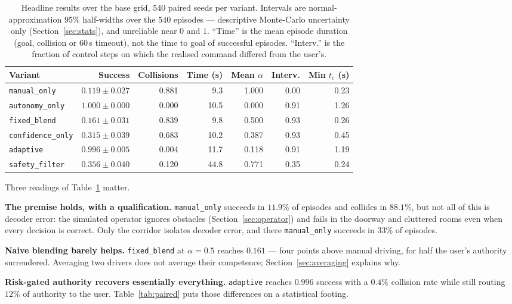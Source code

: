 \documentclass[11pt,a4paper]{article}
\newcommand{\vmanual}{\texttt{manual\_only}}
\newcommand{\vauto}{\texttt{autonomy\_only}}
\newcommand{\vfixed}{\texttt{fixed\_blend}}
\newcommand{\vconf}{\texttt{confidence\_only}}
\newcommand{\vadapt}{\texttt{adaptive}}
\newcommand{\vsafety}{\texttt{safety\_filter}}
\newcommand{\ttc}{t_{\mathrm{c}}}
\theoremstyle{plain}
\theoremstyle{definition}
\begin{document}
\begin{table}[htbp]
\centering
\small
\begin{tabular}{@{}lrrrrrr@{}}
\toprule
Variant & Success & Collisions & Time (s) & Mean $\alpha$ & Interv. & Min $\ttc$ (s)\\
\midrule
\vmanual  & $0.119 \pm 0.027$ & 0.881 & 9.3  & 1.000 & 0.00 & 0.23 \\
\vauto    & $\mathbf{1.000} \pm 0.000$ & 0.000 & 10.5 & 0.000 & 0.91 & 1.26 \\
\vfixed   & $0.161 \pm 0.031$ & 0.839 & 9.8  & 0.500 & 0.93 & 0.26 \\
\vconf    & $0.315 \pm 0.039$ & 0.683 & 10.2 & 0.387 & 0.93 & 0.45 \\
\vadapt   & $\mathbf{0.996} \pm 0.005$ & 0.004 & 11.7 & 0.118 & 0.91 & 1.19 \\
\vsafety  & $0.356 \pm 0.040$ & 0.120 & 44.8 & 0.771 & 0.35 & 0.24 \\
\bottomrule
\end{tabular}
\caption{Headline results over the base grid, $540$ paired seeds per
variant. Intervals are normal-approximation $95\%$ half-widths over the
$540$ episodes --- descriptive Monte-Carlo uncertainty only
(Section~\ref{sec:stats}), and unreliable near $0$ and $1$. ``Time'' is
the mean episode duration (goal, collision or $60$\,s timeout), not the
time to goal of successful episodes. ``Interv.'' is the fraction of
control steps on which the realised command differed from the user's.}
\label{tab:headline}
\end{table}

Three readings of Table~\ref{tab:headline} matter.

\textbf{The premise holds, with a qualification.} \vmanual{} succeeds
in $11.9\%$ of episodes and collides in $88.1\%$, but not all of this is
decoder error: the simulated operator ignores obstacles
(Section~\ref{sec:operator}) and fails in the doorway and cluttered
rooms even when every decision is correct. Only the corridor isolates
decoder error, and there \vmanual{} succeeds in $33\%$ of episodes.

\textbf{Naive blending barely helps.} \vfixed{} at $\alpha = 0.5$
reaches $0.161$ --- four points above manual driving, for half the
user's authority surrendered. Averaging two drivers does not average
their competence; Section~\ref{sec:averaging} explains why.

\textbf{Risk-gated authority recovers essentially everything.}
\vadapt{} reaches $0.996$ success with a $0.4\%$ collision rate while
still routing $12\%$ of authority to the user.
Table~\ref{tab:paired} puts those differences on a statistical footing.
\end{document}
